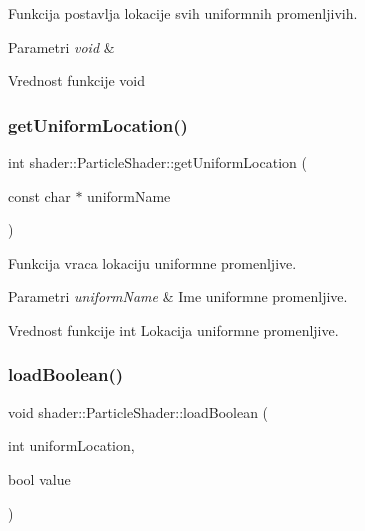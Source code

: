 Funkcija postavlja lokacije svih uniformnih promenljivih. 


\begin{DoxyParams}{Parametri}
{\em void} & \\
\hline
\end{DoxyParams}
\begin{DoxyReturn}{Vrednost funkcije}
void 
\end{DoxyReturn}
\mbox{\label{classshader_1_1ParticleShader_ade4e67ce9cc3b4d2a7ca068fc8ae885f}} 
\subsubsection{\texorpdfstring{get\+Uniform\+Location()}{getUniformLocation()}}
{\footnotesize\ttfamily int shader\+::\+Particle\+Shader\+::get\+Uniform\+Location (\begin{DoxyParamCaption}\item[{const char $\ast$}]{uniform\+Name }\end{DoxyParamCaption})}



Funkcija vraca lokaciju uniformne promenljive. 


\begin{DoxyParams}{Parametri}
{\em uniform\+Name} & Ime uniformne promenljive. \\
\hline
\end{DoxyParams}
\begin{DoxyReturn}{Vrednost funkcije}
int Lokacija uniformne promenljive. 
\end{DoxyReturn}
\mbox{\label{classshader_1_1ParticleShader_ac4108c33106a52c28c41cbe0ddbaaed7}} 
\subsubsection{\texorpdfstring{load\+Boolean()}{loadBoolean()}}
{\footnotesize\ttfamily void shader\+::\+Particle\+Shader\+::load\+Boolean (\begin{DoxyParamCaption}\item[{int}]{uniform\+Location,  }\item[{bool}]{value }\end{DoxyParamCaption})}



